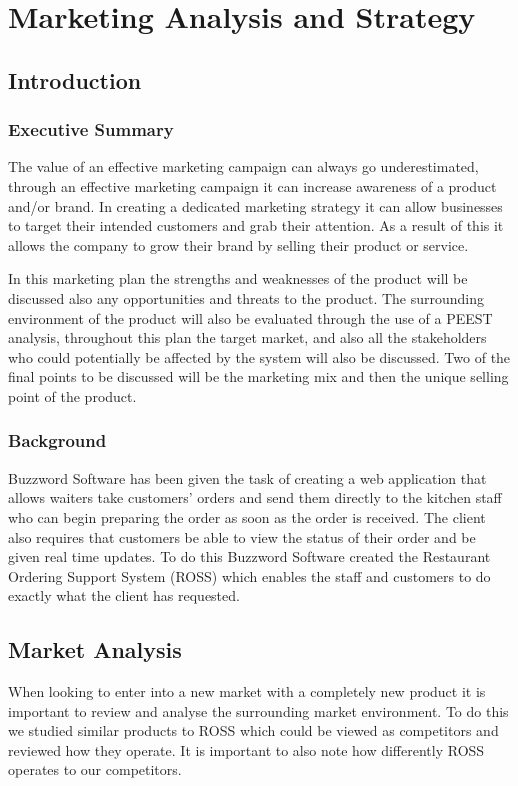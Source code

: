 \documentclass[11pt, oneside, a4paper]{report}   %
\begin{document}
\tableofcontents
\pagebreak
\dominitoc %
\chapter{Marketing Analysis and Strategy}
\pagebreak
\pagebreak
\minitoc
\pagebreak
\section{Introduction}
\subsection{Executive Summary}
\begin{flushleft}
	The value of an effective marketing campaign can always go underestimated, through an effective marketing campaign it can increase awareness of a product and/or brand. In creating a dedicated marketing strategy it can allow businesses to target their intended customers and grab their attention. As a result of this it allows the company to grow their brand by selling their product or service.
	
	In this marketing plan the strengths and weaknesses of the product will be discussed also any opportunities and threats to the product. The surrounding environment of the product will also be evaluated through the use of a PEEST analysis, throughout this plan the target market, and also all the stakeholders who could potentially be affected by the system will also be discussed. Two of the final points to be discussed will be the marketing mix and then the unique selling point of the product.
	
	\subsection{Background}
	Buzzword Software has been given the task of creating a web application that allows waiters take customers’ orders and send them directly to the kitchen staff who can begin preparing the order as soon as the order is received. The client also requires that customers be able to view the status of their order and be given real time updates. To do this Buzzword Software created the Restaurant Ordering Support System (ROSS) which enables the staff and customers to do exactly what the client has requested.


\newpage
\section{Market Analysis}
When looking to enter into a new market with a completely new product it is important to review and analyse the surrounding market environment. To do this we studied similar products to ROSS which could be viewed as competitors and reviewed how they operate. It is important to also note how differently ROSS operates to our competitors. 


\end{flushleft}
\end{document}
